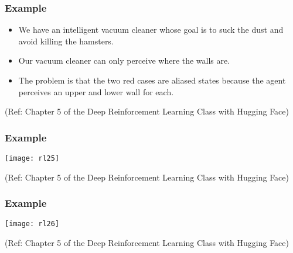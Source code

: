 \begin{frame}[fragile]\frametitle{Example  }

\begin{itemize}
\item We have an intelligent vacuum cleaner whose goal is to suck the dust and avoid killing the hamsters.
\item Our vacuum cleaner can only perceive where the walls are.
\item The problem is that the two red cases are aliased states because the agent perceives an upper and lower wall for each.
\end{itemize}

{\tiny (Ref: Chapter 5 of the Deep Reinforcement Learning Class with Hugging Face)}

\end{frame}

\begin{frame}[fragile]\frametitle{Example  }



\begin{center}
\texttt{[image: rl25]}

\end{center}

{\tiny (Ref: Chapter 5 of the Deep Reinforcement Learning Class with Hugging Face)}

\end{frame}



\begin{frame}[fragile]\frametitle{Example  }

\begin{center}
\texttt{[image: rl26]}

\end{center}

{\tiny (Ref: Chapter 5 of the Deep Reinforcement Learning Class with Hugging Face)}

\end{frame}





